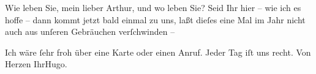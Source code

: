 \pstart
           Wie leben Sie, mein lieber Arthur, und wo leben Sie? Seid Ihr hier – wie ich es hoffe
               – dann kommt jetzt bald einmal zu uns, laßt dieſes eine Mal im Jahr nicht auch aus
               unſeren Gebräuchen verſchwinden – \pend
           
\pstart
           Ich wäre ſehr froh über eine Karte oder einen Anruf. Jeder Tag iſt uns recht.\pend
           \pstart Von Herzen Ihr\spacefill\mbox{Hugo.}\pend{}\endnumbering{}  
      